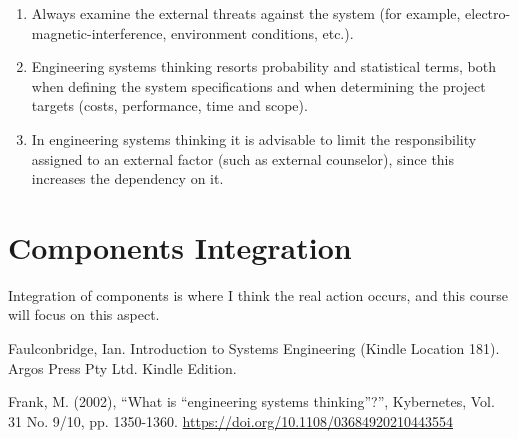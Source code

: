 \documentclass[11pt]{article}
\begin{document}
\begin{enumerate}
\item Always examine the external threats against the system (for example, electro-magnetic-interference, environment conditions, etc.).
\item Engineering systems thinking resorts probability and statistical terms, both when defining the system specifications and when determining the project targets (costs, performance, time and scope).
\item In engineering systems thinking it is advisable to limit the responsibility assigned to an external factor (such as external counselor), since this increases the dependency on it.
\end{enumerate}

\section{Components Integration }
Integration of components is where I think the real action occurs, and this course will focus on this aspect.


\begin{thebibliography}{9}


Faulconbridge, Ian. Introduction to Systems Engineering (Kindle Location 181). Argos Press Pty Ltd. Kindle Edition. 

Frank, M. (2002), ``What is ``engineering systems thinking''?'', Kybernetes, Vol. 31 No. 9/10, pp. 1350-1360. \url{https://doi.org/10.1108/03684920210443554}
\end{thebibliography}
\end{document}
